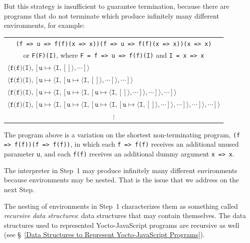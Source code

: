 \documentclass[12pt, oneside]{book}
\begin{document}
But this strategy is insufficient to guarantee termination, because there are programs that do not terminate which produce infinitely many different environments, for example:

\begin{center}
\begin{tabular}{l}
\multicolumn{1}{c}{\texttt{(f => u => f(f)(x => x))(f => u => f(f)(x => x))(x => x)}} \\
\multicolumn{1}{c}{or \texttt{F(F)(I)}, where \texttt{F = f => u => f(f)(I)} and \texttt{I = x => x}} \\
$\langle \texttt{f(f)(I)}, [\texttt{u} \mapsto \langle \texttt{I}, [] \rangle, \cdots] \rangle$ \\
$\langle \texttt{f(f)(I)}, [\texttt{u} \mapsto \langle \texttt{I}, [\texttt{u} \mapsto \langle \texttt{I}, [] \rangle, \cdots] \rangle, \cdots] \rangle$ \\
$\langle \texttt{f(f)(I)}, [\texttt{u} \mapsto \langle \texttt{I}, [\texttt{u} \mapsto \langle \texttt{I}, [\texttt{u} \mapsto \langle \texttt{I}, [] \rangle, \cdots] \rangle, \cdots] \rangle, \cdots] \rangle$ \\
$\langle \texttt{f(f)(I)}, [\texttt{u} \mapsto \langle \texttt{I}, [\texttt{u} \mapsto \langle \texttt{I}, [\texttt{u} \mapsto \langle \texttt{I}, [\texttt{u} \mapsto \langle \texttt{I}, [] \rangle, \cdots] \rangle, \cdots] \rangle, \cdots] \rangle, \cdots] \rangle$ \\
\multicolumn{1}{c}{$\vdots$} \\
\end{tabular}
\end{center}

The program above is a variation on the shortest non-terminating program, \texttt{(f => f(f))(f => f(f))}, in which each \texttt{f => f(f)} receives an additional unused parameter \texttt{u}, and each \texttt{f(f)} receives an additional dummy argument \texttt{x => x}.

The interpreter in Step~1 may produce infinitely many different environments because environments may be nested. That is the issue that we address on the next Step.

\begin{mdframed}[frametitle = {Technical Terms}]
The nesting of environments in Step~1 characterizes them as something called \emph{recursive data structures}: data structures that may contain themselves. The data structures used to represented Yocto-JavaScript programs are recursive as well (see §~\ref{Data Structures to Represent Yocto-JavaScript Programs}).
\end{mdframed}
\end{document}
